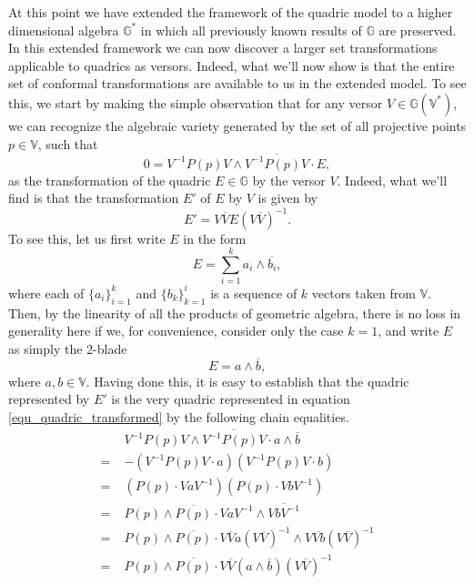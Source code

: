 \documentclass{birkjour}
\theoremstyle{definition}
\theoremstyle{remark}
\numberwithin{equation}{section}
\newcommand{\G}{\mathbb{G}}
\newcommand{\V}{\mathbb{V}}
\begin{document}
At this point we have extended the framework of the quadric model to a higher dimensional
algebra $\G^*$ in which all previously known results of $\G$ are preserved.  In this extended framework
we can now discover a larger set transformations applicable to quadrics as versors.  Indeed, what
we'll now show is that the entire set of conformal transformations are available to us in the extended model.
To see this, we start by making the simple observation that for any versor $V\in\G(\V^*)$, we can
recognize the algebraic variety generated by the set of all projective points $p\in\V$, such that
\begin{equation}\label{equ_quadric_transformed}
0 = V^{-1}P(p)V\wedge\overline{V^{-1}P(p)V}\cdot E,
\end{equation}
as the transformation of the quadric $E\in\G$ by the versor $V$.  Indeed, what we'll find
is that the transformation $E'$ of $E$ by $V$ is given by
\begin{equation}
E' = V\overline{V}E(V\overline{V})^{-1}.
\end{equation}
To see this, let us first write $E$ in the form
\begin{equation}
E = \sum_{i=1}^k a_i\wedge\overline{b_i},
\end{equation}
where each of $\{a_i\}_{i=1}^k$ and $\{b_k\}_{k=1}^i$ is a sequence of $k$ vectors taken from $\V$.
Then, by the linearity of all the products of geometric algebra, there is no loss in generality here
if we, for convenience, consider only the case $k=1$, and write $E$ as simply the 2-blade
\begin{equation}
E = a\wedge\overline{b},
\end{equation}
where $a,b\in\V$.  Having done this, it is easy to establish that the quadric represented by $E'$
is the very quadric represented in equation \eqref{equ_quadric_transformed} by the following chain equalities.
\begin{align}
 & V^{-1}P(p)V\wedge\overline{V^{-1}P(p)V}\cdot a\wedge\overline{b} \\
=\;& -(V^{-1}P(p)V\cdot a)(V^{-1}P(p)V\cdot b) \\
=\;& (P(p)\cdot VaV^{-1})(P(p)\cdot VbV^{-1}) \\
=\;& P(p)\wedge\overline{P(p)}\cdot VaV^{-1}\wedge\overline{VbV^{-1}} \\
=\;& P(p)\wedge\overline{P(p)}\cdot V\overline{V}a(V\overline{V})^{-1}\wedge V\overline{Vb}(V\overline{V})^{-1} \\
=\;& P(p)\wedge\overline{P(p)}\cdot V\overline{V}(a\wedge\overline{b})(V\overline{V})^{-1}
\end{align}
\end{document}

